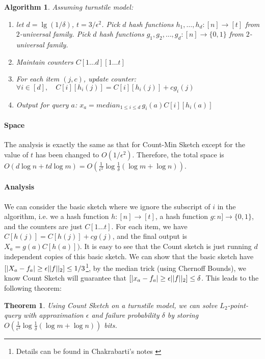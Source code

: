 \documentclass[11pt]{article}
\theoremstyle{plain}
\newtheorem{theorem}{Theorem}[section]
\newtheorem{algorithm}{Algorithm}[section]
\let\Pr\relax
\DeclareMathOperator*{\Pr}{\mathbb{P}}
\begin{document}
\begin{algorithm}
	
\label{al:count}
Assuming turnstile model:
\begin{enumerate}
	\item let $d = \lg(1/\delta)$, $t=3/\epsilon^2$. Pick $d$ hash functions 
	$h_1,\dots, h_d: [n]\rightarrow[t]$ from $2$-universal family. Pick $d$ hash 
	functions $g_1, g_2,\dots,g_d: [n]\rightarrow\{0,1\}$ from $2$-universal family.
	\item Maintain counters $C[1\dots d][1\dots t]$
	\item For each item $(j,c)$, update counter: $\forall i\in [d], \quad 
	C[i][h_i(j)]=C[i][h_i(j)]+cg_i(j)$
	\item Output for query $a$: $x_a=median_{1\leq i \leq d}\, g_i(a)C[i][h_i(a)]$
\end{enumerate}
\end{algorithm}

\paragraph{Space}
The analysis is exactly the same as that for Count-Min Sketch except for the 
value of $t$ has been changed to $O(1/\epsilon^2)$. Therefore, the 
total space is $O(d\log n + td \log m)=O(\frac{1}{\epsilon^2}\log 
\frac{1}{\delta}(\log m +\log n))$. 


\paragraph{Analysis}
We can consider the basic sketch where we ignore the subscript of $i$ in the 
algorithm, i.e. we a hash function $h: [n]\rightarrow[t]$, a hash function $g: 
n]\rightarrow\{0,1\}$, and the counters are just $C[1\dots t]$. For each item, we 
have $C[h(j)]=C[h(j)]+cg(j)$, and the final output is $X_a=g(a)C[h(a)])$. It is 
easy to see that the Count sketch is just running $d$ independent copies of this 
basic sketch. We can show that the basic sketch have $\Pr[|X_a-f_a|\geq 
\epsilon||f||_2]\leq 1/3$\footnote{Details can be found in Chakrabarti's notes 
\cite{Cha2015-notes}}, by the median trick (using Chernoff Bounds), we 
know Count Sketch will guarantee that  $\Pr[|x_a-f_a|\geq \epsilon||f||_2]\leq 
\delta$.  
This leads to the following theorem:

\begin{theorem}
	Using Count Sketch on a turnstile model, we can solve 
	$L_2$-point-query with approximation 
	$\epsilon$ and failure probability $\delta$ by storing 
	$O(\frac{1}{\epsilon^2}\log 
	\frac{1}{\delta}(\log m 
	+\log n))$ bits.
\end{theorem}
\end{document}
